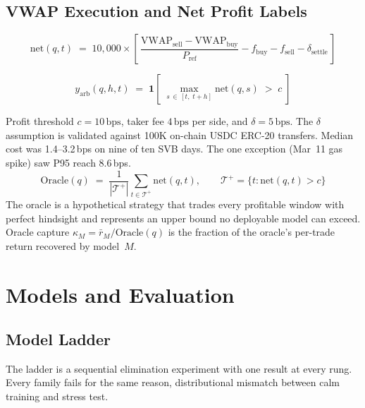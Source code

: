 \documentclass[sigconf,anonymous,natbib=false]{acmart}
\newcommand{\bps}{\,\text{bps}}
\begin{document}
\subsection{VWAP Execution and Net Profit Labels}
\label{sec:netlabels}

\begin{equation}
  \text{net}(q,t) \;=\; 10{,}000 \times
    \left[\,
      \frac{\text{VWAP}_{\text{sell}} - \text{VWAP}_{\text{buy}}}{P_{\text{ref}}}
      - f_{\text{buy}} - f_{\text{sell}} - \delta_{\text{settle}}
    \,\right]
  \label{eq:net}
\end{equation}

\begin{equation}
  y_{\text{arb}}(q,h,t) \;=\; \mathbf{1}\!\left[\;
    \underset{s\,\in\,[t,\;t{+}h]}{\max} \text{net}(q,s) \;>\; c
  \;\right]
  \label{eq:yarb}
\end{equation}

Profit threshold $c{=}10\bps$, taker fee $4\bps$ per side, and
$\delta{=}5\bps$.
The $\delta$ assumption is validated against 100K on-chain USDC
ERC-20 transfers. Median cost was 1.4--3.2\,bps on nine of ten SVB
days. The one exception (Mar~11 gas spike) saw P95 reach 8.6\,bps.
\begin{equation}
  \text{Oracle}(q) \;=\; \frac{1}{|\mathcal{T}^+|}
    \sum_{t \in \mathcal{T}^+} \!\text{net}(q,t),\qquad
  \mathcal{T}^+ = \bigl\{t : \text{net}(q,t) > c\bigr\}
  \label{eq:oracle}
\end{equation}
The oracle is a hypothetical strategy that trades every
profitable window with perfect hindsight and represents an upper bound
no deployable model can exceed.
Oracle capture $\kappa_M = \bar{r}_M / \text{Oracle}(q)$ is the
fraction of the oracle's per-trade return recovered by model~$M$.


\section{Models and Evaluation}
\label{sec:models}

\subsection{Model Ladder}
\label{sec:stack}

The ladder is a sequential elimination experiment with one result at
every rung. Every family fails for the same reason, distributional
mismatch between calm training and stress test.
\end{document}
